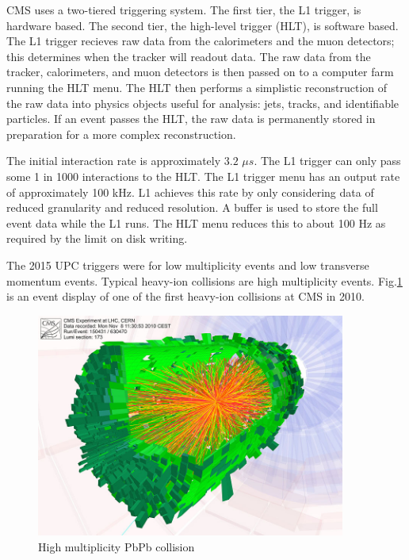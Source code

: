 CMS uses a two-tiered triggering system. The first tier, the L1 trigger, is hardware based. The second tier, the high-level trigger (HLT), is software based. The L1 trigger recieves raw data from the calorimeters and the muon detectors; this determines when the tracker will readout data. The raw data from the tracker, calorimeters, and muon detectors is then passed on to a computer farm running the HLT menu. The HLT then performs a simplistic reconstruction of the raw data into physics objects useful for analysis: jets, tracks, and identifiable particles. If an event passes the HLT, the raw data is permanently stored in preparation for a more complex reconstruction. 

The initial interaction rate is approximately $3.2$ $\mu s$. The L1 trigger can only pass some 1 in 1000 interactions to the HLT. The L1 trigger menu has an output rate of approximately 100 kHz. L1 achieves this rate by only considering data of reduced granularity and reduced resolution. A buffer is used to store the full event data while the L1 runs. The HLT menu reduces this to about 100 Hz as required by the limit on disk writing. 

The 2015 UPC triggers were for low multiplicity events and low transverse momentum events. Typical heavy-ion collisions are high multiplicity events. Fig.\ref{fig:eventdisplayHI} is an event display of one of the first heavy-ion collisions at CMS in 2010.

\begin{figure}[h!]
\begin{centering}
\includegraphics[width=4in]{Chapter3/importfigs/cms_firstleadcoll.jpg}
\par\end{centering}
\caption{High multiplicity PbPb collision \label{fig:eventdisplayHI}}
\end{figure}

